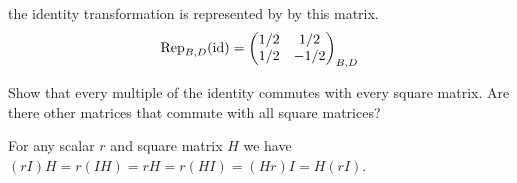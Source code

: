 \begin{exercises}
\begin{answer}
      the identity transformation is represented by by this matrix.
      \begin{equation*}
         \rep{\text{id}}{B,D}=
         \begin{pmatrix}
           1/2  &1/2  \\
           1/2  &-1/2
         \end{pmatrix}_{B,D}
      \end{equation*}   
    \end{answer}
  \item 
    Show that every multiple of the identity commutes with every
    square matrix.
    Are there other matrices that commute with all square matrices?
    \begin{answer}
      For any scalar \( r \) and square matrix \( H \) we have
      \( (rI)H=r(IH)=rH=r(HI)=(Hr)I=H(rI) \).


\end{answer}
\end{exercises}
